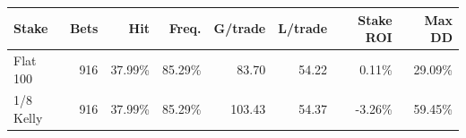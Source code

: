 \begin{tabularx}{\linewidth}{@{}Yrrrrrrr@{}}
\toprule
Stake & Bets & Hit & Freq. & G/trade & L/trade & Stake ROI & Max DD \\

\midrule
Flat 100 & 916 & 37.99\% & 85.29\% & 83.70 & 54.22 & 0.11\% & 29.09\% \\
1/8 Kelly & 916 & 37.99\% & 85.29\% & 103.43 & 54.37 & -3.26\% & 59.45\% \\
\bottomrule
\end{tabularx}

